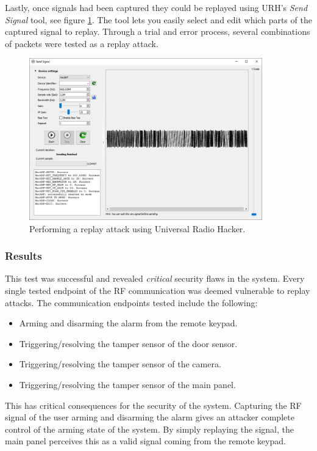 Lastly, once signals had been captured they could be replayed using URH's \textit{Send Signal} tool, see figure \ref{fig:uhr-replay-tool}. The tool lets you easily select and edit which parts of the captured signal to replay. Through a trial and error process, several combinations of packets were tested as a replay attack.
\begin{figure}[!ht]
    \centering
    \includegraphics[width=0.9\textwidth]{images/6-pentesting/replay-signal.png}
    \caption{Performing a replay attack using Universal Radio Hacker.}
    \label{fig:uhr-replay-tool}
\end{figure}

\subsubsection{Results}
This test was successful and revealed \textit{critical} security flaws in the system. Every single tested endpoint of the RF communication was deemed vulnerable to replay attacks. The communication endpoints tested include the following:
\begin{itemize}
    \item Arming and disarming the alarm from the remote keypad.
    \item Triggering/resolving the tamper sensor of the door sensor.
    \item Triggering/resolving the tamper sensor of the camera.
    \item Triggering/resolving the tamper sensor of the main panel.
\end{itemize}
This has critical consequences for the security of the system. Capturing the RF signal of the user arming and disarming the alarm gives an attacker complete control of the arming state of the system. By simply replaying the signal, the main panel perceives this as a valid signal coming from the remote keypad.

